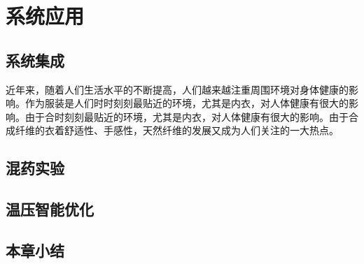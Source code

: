 \chapter{系统应用}
\label{chap:intro}
\section{系统集成}

近年来，随着人们生活水平的不断提高，人们越来越注重周围环境对身体健康的影响。作为服装是人们时时刻刻最贴近的环境，尤其是内衣，对人体健康有很大的影响。由于合时刻刻最贴近的环境，尤其是内衣，对人体健康有很大的影响。由于合成纤维的衣着舒适性、手感性，天然纤维的发展又成为人们关注的一大热点。\supercite{Takahashi1996Structure,Xia2002Analysis,Jiang1989,Mao2000Motion,Feng1998}

\section{混药实验}

\section{温压智能优化}


\section{本章小结}
